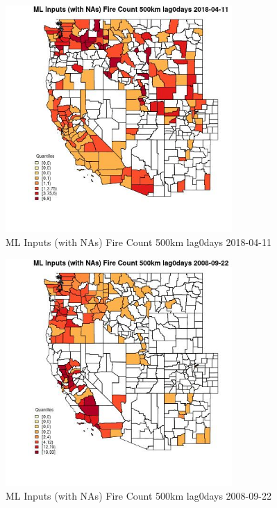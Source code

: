 \begin{figure} 
\centering  
\includegraphics[width=0.77\textwidth]{Code_Outputs/Report_ML_input_PM25_Step4_part_e_de_duplicated_aves_compiled_2019-05-18wNAs_CountyFire_Count_500km_lag0daysMean2018-04-11_2018-04-11.jpg} 
\caption{\label{fig:Report_ML_input_PM25_Step4_part_e_de_duplicated_aves_compiled_2019-05-18wNAsCountyFire_Count_500km_lag0daysMean2018-04-11_2018-04-11}ML Inputs (with NAs) Fire Count 500km lag0days 2018-04-11} 
\end{figure} 
 

\begin{figure} 
\centering  
\includegraphics[width=0.77\textwidth]{Code_Outputs/Report_ML_input_PM25_Step4_part_e_de_duplicated_aves_compiled_2019-05-18wNAs_CountyFire_Count_500km_lag0daysMean2008-09-22_2008-09-22.jpg} 
\caption{\label{fig:Report_ML_input_PM25_Step4_part_e_de_duplicated_aves_compiled_2019-05-18wNAsCountyFire_Count_500km_lag0daysMean2008-09-22_2008-09-22}ML Inputs (with NAs) Fire Count 500km lag0days 2008-09-22} 
\end{figure} 
 

